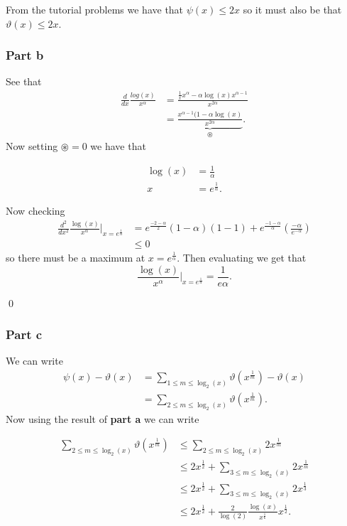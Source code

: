 \documentclass{unswmaths}
\begin{document}
From the tutorial problems we have that $ \psi(x) \leq 2x $ so it must also be that $ \vartheta(x) \leq 2x $.


\subsubsection*{Part b}

See that 
\begin{align*}
	\frac{d}{dx} \frac{log(x)}{x^\alpha} &= \frac{\frac{1}{x} x^\alpha - \alpha \log(x) x^{\alpha-1}}{x^{2\alpha}} \\
		&= \underbrace{\frac{x^{\alpha-1}( 1 - \alpha \log(x)}{x^{2 \alpha}}}_{\circledast}.
\end{align*}
Now setting $ \circledast = 0 $
we have that 

\begin{align*}
	\log(x) &= \frac{1}{\alpha} \\
	x &= e^{\frac{1}{\alpha}}.
\end{align*}


Now checking
\begin{align*}
	\frac{d^2}{dx^2} \frac{\log(x)}{x^\alpha} \Big|_{x = e^{\frac{1}{\alpha}}} &= e^{\frac{-2-\alpha}{2}}(1-\alpha)(1 - 1) + e^\frac{-1-\alpha}{\alpha}\left( \frac{-\alpha}{e^{-\alpha}} \right) \\
	&\leq 0 
\end{align*}
so there must be a maximum at $ x = e^\frac{1}{\alpha} $. Then evaluating we get that
$$
	\frac{\log(x)}{x^\alpha} \Big|_{x = e^\frac{1}{\alpha}} = \frac{1}{e\alpha}.
$$

\qed

\subsubsection*{Part c}

We can write
\begin{align*}
	\psi(x) - \vartheta(x) &= \sum_{1 \leq m \leq \log_2(x)} \vartheta(x^\frac{1}{m}) - \vartheta(x) \\
		&= \sum_{2 \leq m \leq \log_2(x)} \vartheta(x^\frac{1}{m}).
\end{align*}
Now using the result of \textbf{part a} we can write

\begin{align*}
	\sum_{2 \leq m \leq \log_2(x)} \vartheta(x^\frac{1}{m}) &\leq \sum_{2 \leq m \leq \log_2(x)} 2x^\frac{1}{m} \\
		&\leq 2x^\frac{1}{2} + \sum_{3 \leq m \leq \log_2(x)} 2x^\frac{1}{m} \\
		&\leq 2x^\frac{1}{2} + \sum_{3 \leq m \leq \log_2(x)} 2x^\frac{1}{3} \\
		&\leq 2x^\frac{1}{2} + \frac{2}{\log(2)} \frac{\log(x)}{x^\frac{1}{6}} x^\frac{1}{2}.
\end{align*}
\end{document}
